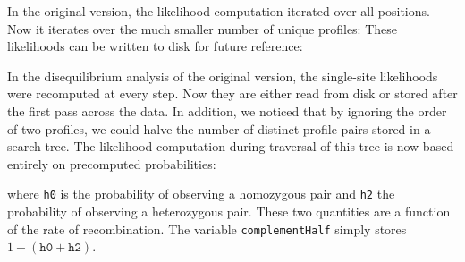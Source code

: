 \documentclass{sig-alternate}
\newcommand{\ty}{\texttt}
\begin{document}
In the original version, the likelihood computation iterated over all
positions. Now it iterates over the much smaller number of unique profiles:
These likelihoods can be written to disk for future reference:

In the disequilibrium analysis of the original version, the
single-site likelihoods were recomputed at every step. Now they are
either read from disk or stored after the first pass across the
data. In addition, we noticed that by ignoring the order of two
profiles, we could halve the number of distinct profile pairs stored in
a search tree. The likelihood computation during traversal of this tree is now based entirely on
precomputed probabilities:


where \ty{h0} is the probability of observing a homozygous pair and
\ty{h2} the probability of observing a heterozygous pair. These two
quantities are a function of the rate of recombination. The variable
\ty{complementHalf} simply stores $1-(\ty{h0} + \ty{h2})$.
\end{document}
